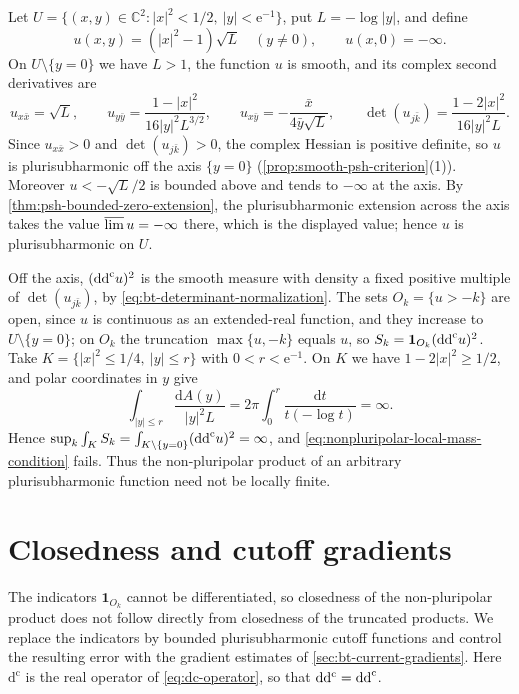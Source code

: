 \begin{example}\label{ex:nonpluripolar-infinite-local-mass}
Let $U=\{(x,y)\in\mathbb C^2:|x|^2<1/2,\ |y|<\mathrm e^{-1}\}$, put $L=-\log|y|$, and define
\[
 u(x,y)=(|x|^2-1)\sqrt L\quad(y\ne0),\qquad u(x,0)=-\infty.
\]
On $U\setminus\{y=0\}$ we have $L>1$, the function $u$ is smooth, and its complex second derivatives are
\[
 u_{x\bar x}=\sqrt L,\qquad
 u_{y\bar y}=\frac{1-|x|^2}{16|y|^2L^{3/2}},\qquad
 u_{x\bar y}=-\frac{\bar x}{4\bar y\sqrt L},\qquad
 \det(u_{j\bar k})=\frac{1-2|x|^2}{16|y|^2L}.
\]
Since $u_{x\bar x}>0$ and $\det(u_{j\bar k})>0$, the complex Hessian is positive definite, so $u$ is plurisubharmonic off the axis $\{y=0\}$ (\cref{prop:smooth-psh-criterion}(1)). Moreover $u<-\sqrt L/2$ is bounded above and tends to $-\infty$ at the axis. By \cref{thm:psh-bounded-zero-extension}, the plurisubharmonic extension across the axis takes the value $\varlimsup u=-\infty$ there, which is the displayed value; hence $u$ is plurisubharmonic on $U$.

Off the axis, $(\mathrm{dd}^{\mathrm{c}} u)^2$ is the smooth measure with density a fixed positive multiple of $\det(u_{j\bar k})$, by \eqref{eq:bt-determinant-normalization}. The sets $O_k=\{u>-k\}$ are open, since $u$ is continuous as an extended-real function, and they increase to $U\setminus\{y=0\}$; on $O_k$ the truncation $\max\{u,-k\}$ equals $u$, so $S_k=\mathbf1_{O_k}(\mathrm{dd}^{\mathrm{c}} u)^2$. Take $K=\{|x|^2\leq1/4,\ |y|\leq r\}$ with $0<r<\mathrm e^{-1}$. On $K$ we have $1-2|x|^2\geq1/2$, and polar coordinates in $y$ give
\[
 \int_{|y|\leq r}\frac{\mathrm dA(y)}{|y|^2L}=2\pi\int_0^r\frac{\mathrm dt}{t(-\log t)}=\infty .
\]
Hence $\sup_k\int_KS_k=\int_{K\setminus\{y=0\}}(\mathrm{dd}^{\mathrm{c}} u)^2=\infty$, and \eqref{eq:nonpluripolar-local-mass-condition} fails. Thus the non-pluripolar product of an arbitrary plurisubharmonic function need not be locally finite.
\end{example}

\section{Closedness and cutoff gradients}
\label{sec:nonpluripolar-closedness}
The indicators $\mathbf1_{O_k}$ cannot be differentiated, so closedness of the non-pluripolar product does not follow directly from closedness of the truncated products. We replace the indicators by bounded plurisubharmonic cutoff functions and control the resulting error with the gradient estimates of \cref{sec:bt-current-gradients}. Here $\mathrm d^{\mathrm c}$ is the real operator of \eqref{eq:dc-operator}, so that $\mathrm d\mathrm d^{\mathrm c}=\mathrm{dd}^{\mathrm{c}}$.

